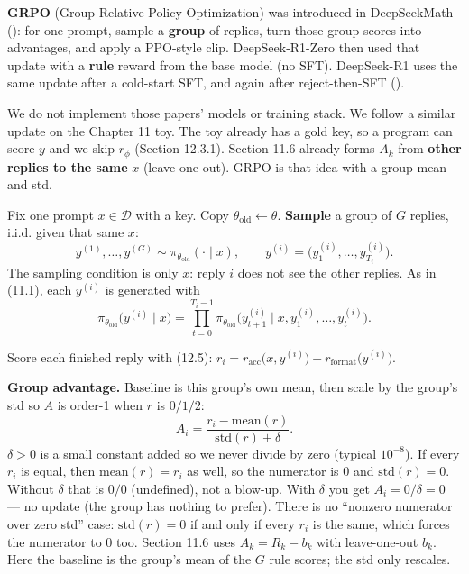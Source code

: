\textbf{GRPO} (Group Relative Policy Optimization) was introduced in DeepSeekMath (): for one prompt, sample a \textbf{group} of replies, turn those group scores into advantages, and apply a PPO-style clip. DeepSeek-R1-Zero then used that update with a \textbf{rule} reward from the base model (no SFT). DeepSeek-R1 uses the same update after a cold-start SFT, and again after reject-then-SFT ().

We do not implement those papers' models or training stack. We follow a similar update on the Chapter 11 toy. The toy already has a gold key, so a program can score $y$ and we skip $r_\phi$ (Section 12.3.1). Section 11.6 already forms $A_k$ from \textbf{other replies to the same} $x$ (leave-one-out). GRPO is that idea with a group mean and std.

Fix one prompt $x\in\mathcal{D}$ with a key. Copy $\theta_{\mathrm{old}}\leftarrow\theta$. \textbf{Sample} a group of $G$ replies, i.i.d. given that same $x$: \[
y^{(1)},\ldots,y^{(G)}\sim\pi_{\theta_{\mathrm{old}}}(\cdot\mid x),
\qquad
y^{(i)}=\bigl(y^{(i)}_1,\ldots,y^{(i)}_{T_i}\bigr).
\] The sampling condition is only $x$: reply $i$ does not see the other replies. As in (11.1), each $y^{(i)}$ is generated with \[
\pi_{\theta_{\mathrm{old}}}\bigl(y^{(i)}\mid x\bigr)
=
\prod_{t=0}^{T_i-1}
\pi_{\theta_{\mathrm{old}}}\bigl(y^{(i)}_{t+1}\mid x,y^{(i)}_1,\ldots,y^{(i)}_t\bigr).
\]

Score each finished reply with (12.5): $r_i=r_{\mathrm{acc}}\bigl(x,y^{(i)}\bigr)+r_{\mathrm{format}}\bigl(y^{(i)}\bigr)$.

\textbf{Group advantage.} Baseline is this group's own mean, then scale by the group's std so $A$ is order-1 when $r$ is $0/1/2$: \begin{equation}
A_i
=
\frac{r_i-\mathrm{mean}(r)}{\mathrm{std}(r)+\delta}.
\tag{12.6}
\end{equation} $\delta>0$ is a small constant added so we never divide by zero (typical $10^{-8}$). If every $r_i$ is equal, then $\mathrm{mean}(r)=r_i$ as well, so the numerator is $0$ and $\mathrm{std}(r)=0$. Without $\delta$ that is $0/0$ (undefined), not a blow-up. With $\delta$ you get $A_i=0/\delta=0$ --- no update (the group has nothing to prefer). There is no ``nonzero numerator over zero std'' case: $\mathrm{std}(r)=0$ if and only if every $r_i$ is the same, which forces the numerator to $0$ too. Section 11.6 uses $A_k=R_k-b_k$ with leave-one-out $b_k$. Here the baseline is the group's mean of the $G$ rule scores; the std only rescales.

